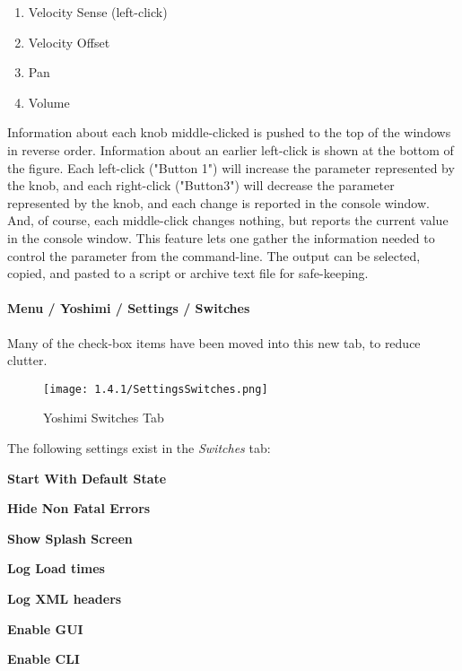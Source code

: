    \begin{enumerate}
      \item Velocity Sense (left-click)
      \item Velocity Offset
      \item Pan
      \item Volume
   \end{enumerate}

   Information about each knob middle-clicked is pushed to the top of the
   windows in reverse order.
   Information about an earlier left-click is shown at the bottom of the figure.
   Each left-click ("Button 1") will increase the parameter represented by the
   knob, and each right-click ("Button3") will decrease the parameter
   represented by the knob, and each change is reported in the console window.
   And, of course, each middle-click changes nothing, but reports the current
   value in the console window.
   This feature lets one gather the information needed to
   control the parameter from the command-line.
   The output can be selected, copied, and pasted to a script or archive text
   file for safe-keeping.


\paragraph{Menu / Yoshimi / Settings / Switches}
\label{paragraph:menu_yoshimi_settings_switches}

   Many of the check-box items have been moved into this new tab, to reduce
   clutter.

\begin{figure}[H]
   \centering 
   \texttt{[image: 1.4.1/SettingsSwitches.png]}
   \caption{Yoshimi Switches Tab}
   \label{fig:yoshimi_settings_switches_tab}
\end{figure}

   The following settings exist in the \textsl{Switches} tab:

   \begin{enumber}
      \item \textbf{Start With Default State}
      \item \textbf{Hide Non Fatal Errors}
      \item \textbf{Show Splash Screen}
      \item \textbf{Log Load times}
      \item \textbf{Log XML headers}
      \item \textbf{Enable GUI}
      \item \textbf{Enable CLI}
   \end{enumber}

